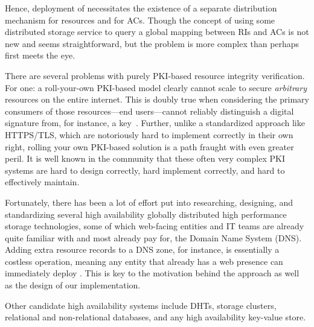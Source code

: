 Hence, deployment of \SYSTEM{} necessitates the existence of a separate
distribution mechanism for resources and for ACs. Though the concept of using
some distributed storage service to query a global mapping between RIs and ACs
is not new and seems straightforward, but the problem is more complex than
perhaps first meets the eye.

There are several problems with purely PKI-based resource integrity
verification. For one: a roll-your-own PKI-based model clearly cannot scale to
secure \emph{arbitrary} resources on the entire internet. This is doubly true
when considering the primary consumers of those resources---end users---cannot
reliably distinguish a digital signature from, for instance, a key~\cite{PGPBad,
Tan, Hsiao, Cherubini}. Further, unlike a standardized approach like HTTPS/TLS,
which are notoriously hard to implement correctly in their own right, rolling
your own PKI-based solution is a path fraught with even greater peril. It is
well known in the community that these often very complex PKI systems are hard
to design correctly, hard implement correctly, and hard to effectively maintain.

Fortunately, there has been a lot of effort put into researching, designing, and
standardizing several high availability globally distributed high performance
storage technologies, some of which web-facing entities and IT teams are already
quite familiar with and most already pay for, \eg the Domain Name System (DNS).
Adding extra resource records to a DNS zone, for instance, is essentially a
costless operation, meaning any entity that already has a web presence can
immediately deploy \SYSTEM{}. This is key to the motivation behind the \SYSTEM{}
approach as well as the design of our \DNSSYS{} implementation.

Other candidate high availability systems include DHTs, storage clusters,
relational and non-relational databases, and any high availability key-value
store.

